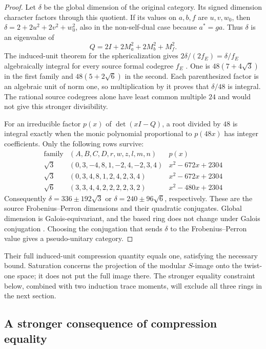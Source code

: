 \begin{proof}
Let $\delta$ be the global dimension of the original category.
Its signed dimension character factors through this quotient. If
its values on $a,b,f$ are $u,v,w_0$, then
$\delta=2+2u^2+2v^2+w_0^2$, also in the non-self-dual case because
$a^*=ga$. Thus $\delta$ is an eigenvalue of
\[
                  Q=2I+2M_a^2+2M_b^2+M_f^2.
\]
The induced-unit theorem for the sphericalization gives
$2\delta/(2f_E)=\delta/f_E$ algebraically integral for every
source formal codegree $f_E$ \cite[Theorem~2.13]{OstrikRank3}.
One is $48(7+4\sqrt3)$ in the first family and $48(5+2\sqrt6)$
in the second. Each parenthesized factor is an algebraic unit of
norm one, so multiplication by it proves that $\delta/48$ is
integral. The rational source codegrees alone have least common
multiple $24$ and would not give this stronger divisibility.

For an irreducible factor $p(x)$ of $\det(xI-Q)$, a root divided by
$48$ is integral exactly when the monic polynomial proportional to
$p(48x)$ has integer coefficients. Only the following rows survive:
\[
\begin{array}{c|c|c}
 \text{family}&(A,B,C,D,r,w,z,l,m,n)&p(x)\\ \hline
 \sqrt3&(0,3,-4,8,1,-2,4,-2,3,4)&x^2-672x+2304\\
 \sqrt3&(0,3,4,8,1,2,4,2,3,4)&x^2-672x+2304\\
 \sqrt6&(3,3,4,4,2,2,2,2,3,2)&x^2-480x+2304
\end{array}
\]
Consequently $\delta=336\pm192\sqrt3$ or
$\delta=240\pm96\sqrt6$, respectively. These are the source
Frobenius--Perron dimensions and their quadratic conjugates.
Global dimension is Galois-equivariant, and the based ring does
not change under Galois conjugation \cite{ENO}. Choosing the
conjugation that sends $\delta$ to the Frobenius--Perron value
gives a pseudo-unitary category.
\end{proof}

Their full induced-unit compression quantity equals one, satisfying the
necessary bound. Saturation concerns the projection of the modular
$S$-image onto the twist-one space; it does not put the full image there.
The stronger equality constraint below, combined with two induction
trace moments, will exclude all three rings in the next section.

\subsection{A stronger consequence of compression equality}

